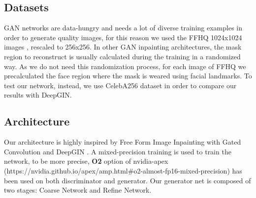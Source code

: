\documentclass[10pt,twocolumn,letterpaper]{article}
\begin{document}
\subsection{Datasets}
GAN networks are data-hungry and needs a lot of diverse training examples in
order to generate quality images, for this reason we used the FFHQ 1024x1024
images \cite{karras2019style}, rescaled to 256x256.  In other GAN inpainting
architectures, the mask region to reconstruct is usually calculated during the
training in a randomized way.  As we do not need this randomization process, for
each image of FFHQ we precalculated the face region where the mask is weared
using facial landmarks. To test our network, instead, we use CelebA256 dataset
in order to compare our results with DeepGIN.

\subsection{Architecture}
Our architecture is highly inspired by Free Form Image Inpainting with Gated
Convolution \cite{yu2019free} and DeepGIN \cite{li2020deepgin}.
A mixed-precision training is used to train the network, to be more precise,
\textbf{O2} option of nvidia-apex
(https://nvidia.github.io/apex/amp.html\#o2-almost-fp16-mixed-precision) has
been used on both discriminator and generator.
Our generator net is composed of two stages: Coarse Network and Refine Network.
\end{document}
